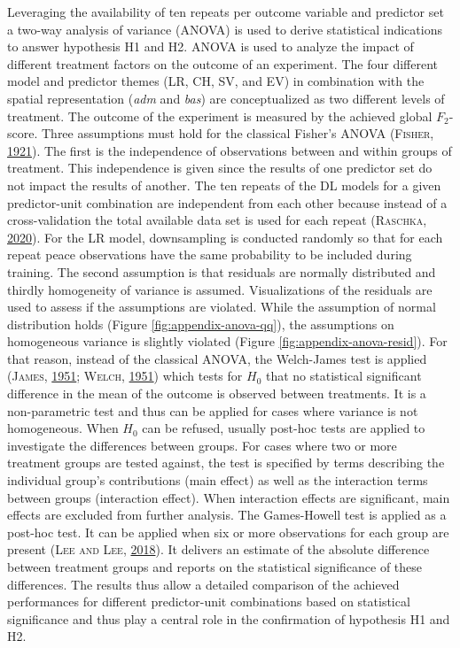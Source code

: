 \documentclass[a4paper,11pt]{article}
\begin{document}
Leveraging the availability of ten repeats per outcome variable and predictor set
a two-way analysis of variance (ANOVA) is used to derive statistical indications
to answer hypothesis H1 and H2. ANOVA is used to analyze the impact of different
treatment factors on the outcome of an experiment. The four different
model and predictor themes (LR, CH, SV, and EV) in combination with the spatial
representation (\emph{adm} and \emph{bas}) are conceptualized as two different levels of
treatment. The outcome of the experiment is measured by the achieved global \(F_2\)-score.
Three assumptions must hold for the classical Fisher's ANOVA \textsc{(\textnormal{\textsc{Fisher}}, \textnormal{\protect\hyperlink{ref-fisher1921}{1921}})}.
The first is the independence of observations between and within groups of
treatment. This independence is given since the results of one predictor set
do not impact the results of another. The ten repeats of the DL models for a
given predictor-unit combination are independent from each other because instead
of a cross-validation the total available data set is used for each repeat \textsc{(\textnormal{\textsc{Raschka}}, \textnormal{\protect\hyperlink{ref-raschka2020}{2020}})}.
For the LR model, downsampling is conducted randomly so
that for each repeat peace observations have the same probability to be included
during training. The second assumption is that residuals are normally distributed
and thirdly homogeneity of variance is assumed.
Visualizations of the residuals are used to assess if the assumptions are violated.
While the assumption of normal distribution holds (Figure \ref{fig:appendix-anova-qq}),
the assumptions on homogeneous variance is slightly violated (Figure
\ref{fig:appendix-anova-resid}). For that reason, instead of the classical ANOVA,
the Welch-James test is applied \textsc{(\textnormal{\textsc{James}}, \textnormal{\protect\hyperlink{ref-james1951}{1951}}; \textnormal{\textsc{Welch}}, \textnormal{\protect\hyperlink{ref-welch1951}{1951}})} which tests for \(H_0\)
that no statistical significant difference in the mean of the outcome is observed between
treatments. It is a non-parametric test and thus can be applied for cases where
variance is not homogeneous. When \(H_0\) can be refused, usually post-hoc tests
are applied to investigate the differences between groups. For cases where two
or more treatment groups are tested against, the test is specified by terms
describing the individual group's contributions (main effect) as well as the
interaction terms between groups (interaction effect). When interaction effects
are significant, main effects are excluded from further analysis. The Games-Howell
test is applied as a post-hoc test. It can be applied when six or more observations
for each group are present \textsc{(\textnormal{\textsc{Lee} and \textsc{Lee}}, \textnormal{\protect\hyperlink{ref-lee2018}{2018}})}. It delivers an estimate of the absolute
difference between treatment groups and reports on the statistical significance
of these differences. The results thus allow a detailed comparison of the
achieved performances for different predictor-unit combinations based on statistical
significance and thus play a central role in the confirmation of hypothesis H1 and H2.
\end{document}
